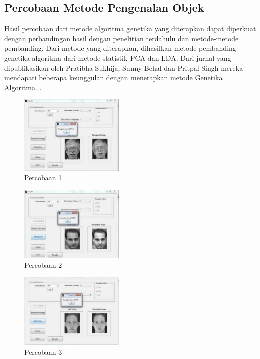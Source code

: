 \documentclass[conference]{IEEEtran}
\begin{document}
\subsection{Percobaan Metode Pengenalan Objek}

Hasil percobaan dari metode algoritma genetika yang diterapkan dapat diperkuat dengan perbandingan hasil dengan penelitian terdahulu dan metode-metode pembanding. Dari metode yang diterapkan, dihasilkan metode pembanding genetika algoritma dari metode statistik PCA dan LDA. Dari jurnal yang dipublikasikan oleh Pratibha Sukhija, Sunny Behal dan Pritpal Singh mereka mendapati beberapa keunggulan dengan menerapkan metode Genetika Algoritma. \cite{Sukhija2016}.

\begin{figure}[htp]
    \centering
    \includegraphics[width=5cm]{images/percobaan_fig1.png}
    \caption{Percobaan 1}
    \label{fig:percobaan1}
\end{figure}

\begin{figure}[htp]
    \centering
    \includegraphics[width=5cm]{images/percobaan_fig2.png}
    \caption{Percobaan 2}
    \label{fig:percobaan2}
\end{figure}

\begin{figure}[htp]
    \centering
    \includegraphics[width=5cm]{images/percobaan_fig3.png}
    \caption{Percobaan 3}
    \label{fig:percobaan3}
\end{figure}
\end{document}
